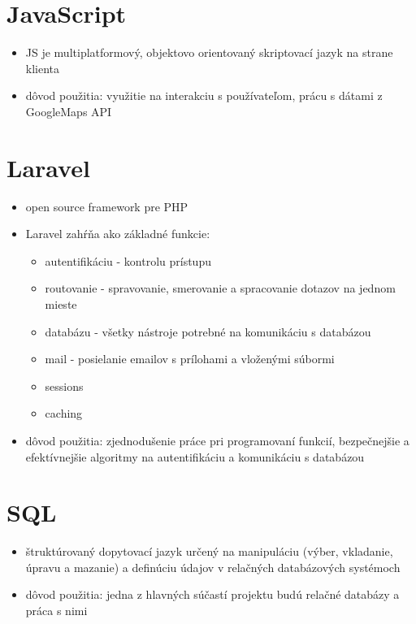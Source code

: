 \documentclass[12pt,a4paper]{report}
\theoremstyle{definition}
\theoremstyle{remark}
\begin{document}
\section{JavaScript}
\begin{itemize}
\item JS je multiplatformový, objektovo orientovaný skriptovací jazyk na strane klienta
\item dôvod použitia: využitie na interakciu s používateľom, prácu s dátami z GoogleMaps API 
\end{itemize}

\section{Laravel}
\begin{itemize}
\item open source framework pre PHP
\item Laravel zahŕňa ako základné funkcie:
	
	\begin{itemize}
	\item autentifikáciu - kontrolu prístupu
	\item routovanie - spravovanie, smerovanie a spracovanie dotazov na jednom mieste
	\item databázu - všetky nástroje potrebné na komunikáciu s databázou
	\item mail - posielanie emailov s prílohami a vloženými súbormi
	\item sessions
	\item caching 
	\end{itemize}

\item dôvod použitia: zjednodušenie práce pri programovaní funkcií, bezpečnejšie a efektívnejšie algoritmy na autentifikáciu a komunikáciu s databázou
\end{itemize}

\section{SQL}
\begin{itemize}
\item štruktúrovaný dopytovací jazyk určený na manipuláciu (výber, vkladanie, úpravu a mazanie) a definúciu údajov v relačných databázových systémoch
\item dôvod použitia: jedna z hlavných súčastí projektu budú relačné databázy a práca s nimi
\end{itemize}
\end{document}
